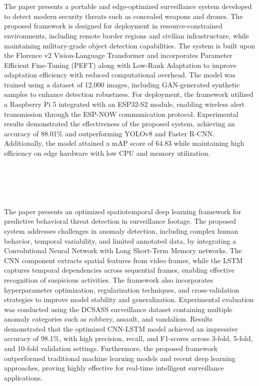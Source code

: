\section[\LitTitleOne]{\LitTitleOne~\textbf{\cite{supplementary_paper_1}} \label{sec:supplementary_paper_1}}
The paper presents a portable and edge-optimized surveillance system developed to detect modern security threats such as concealed weapons and drones. The proposed framework is designed for deployment in resource-constrained environments, including remote border regions and civilian infrastructure, while maintaining military-grade object detection capabilities. The system is built upon the Florence v2 Vision-Language Transformer and incorporates Parameter Efficient Fine-Tuning (PEFT) along with Low-Rank Adaptation to improve adaptation efficiency with reduced computational overhead. The model was trained using a dataset of 12,000 images, including GAN-generated synthetic samples to enhance detection robustness. For deployment, the framework utilized a Raspberry Pi 5 integrated with an ESP32-S2 module, enabling wireless alert transmission through the ESP-NOW communication protocol. Experimental results demonstrated the effectiveness of the proposed system, achieving an accuracy of 88.01\% and outperforming YOLOv8 and Faster R-CNN. Additionally, the model attained a mAP score of 64.83 while maintaining high efficiency on edge hardware with low CPU and memory utilization.\label{end:supplementary_paper_1} \\

\section[\LitTitleTwo]{\LitTitleTwo~\textbf{\cite{supplementary_paper_2}} \label{sec:supplementary_paper_2}}
The paper presents an optimized spatiotemporal deep learning framework for predictive behavioral threat detection in surveillance footage. The proposed system addresses challenges in anomaly detection, including complex human behavior, temporal variability, and limited annotated data, by integrating a Convolutional Neural Network with Long Short-Term Memory networks. The CNN component extracts spatial features from video frames, while the LSTM captures temporal dependencies across sequential frames, enabling effective recognition of suspicious activities. The framework also incorporates hyperparameter optimization, regularization techniques, and cross-validation strategies to improve model stability and generalization. Experimental evaluation was conducted using the DCSASS surveillance dataset containing multiple anomaly categories such as robbery, assault, and vandalism. Results demonstrated that the optimized CNN-LSTM model achieved an impressive accuracy of 98.1\%, with high precision, recall, and F1-scores across 3-fold, 5-fold, and 10-fold validation settings. Furthermore, the proposed framework outperformed traditional machine learning models and recent deep learning approaches, proving highly effective for real-time intelligent surveillance applications.\label{end:supplementary_paper_2} \\

